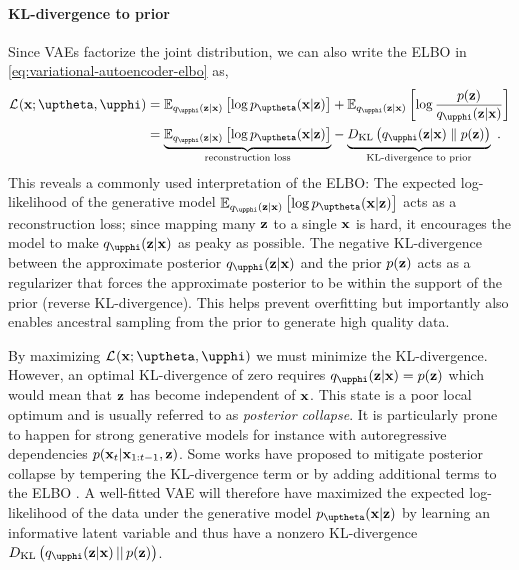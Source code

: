 \paragraph{KL-divergence to prior}
Since VAEs factorize the joint distribution, we can also write the ELBO in \cref{eq:variational-autoencoder-elbo} as,
%
\begin{align} \label{eq:variational-autoencoder-elbo-factorized}
    \mathcal{L}_{}(\xb;\thetab,\phib)
    &= \mathbb{E}_{q_\phib(\zb|\xb)}\left[\log p_\thetab(\xb|\zb)\right] + \mathbb{E}_{q_\phib(\zb|\xb)} \left[ \log \frac{p(\zb)}{q_\phib(\zb|\xb)}\right] \nonumber \\
    &= 
    \underset{\text{reconstruction loss}}{\underbrace{
        \mathbb{E}_{q_\phib(\zb|\xb)}\left[\log p_\thetab(\xb|\zb)\right]
    }}
     - 
    \underset{\text{KL-divergence to prior}}{
        \underbrace{\vphantom{\mathbb{E}_{q_\phib(\zb|\xb)}\left[\log p_\thetab(\xb|\zb)\right]}{D_\text{KL}\left( q_\phib(\zb|\xb) \parallel p(\zb) \right)}
    }} \enspace .
\end{align}
%
This reveals a commonly used interpretation of the ELBO: 
The expected log-likelihood of the generative model $\mathbb{E}_{q_\phib(\zb|\xb)}\left[\log p_\thetab(\xb|\zb)\right]$ acts as a reconstruction loss; since mapping many ${\mathbf{z}}$ to a single ${\mathbf{x}}$ is hard, it encourages the model to make $q_\phib(\zb|\xb)$ as peaky as possible. 
The negative KL-divergence between the approximate posterior $q_\phib(\zb|\xb)$ and the prior $p({\mathbf{z}})$ acts as a regularizer that forces the approximate posterior to be within the support of the prior (reverse KL-divergence). This helps prevent overfitting but importantly also enables ancestral sampling from the prior to generate high quality data. 

By maximizing $\mathcal{L}_{}(\xb;\thetab,\phib)$ we must minimize the KL-divergence. However, an optimal KL-divergence of zero requires $q_\phib(\zb|\xb) = p(\zb)$ which would mean that ${\mathbf{z}}$ has become independent of ${\mathbf{x}}$. 
This state is a poor local optimum and is usually referred to as \emph{posterior collapse}. It is particularly prone to happen for strong generative models for instance with autoregressive dependencies $p({\mathbf{x}}_{t}|{\mathbf{x}}_{1:t-1},{\mathbf{z}})$. Some works have proposed to mitigate posterior collapse by tempering the KL-divergence term \parencite{alemi_fixing_2018,higgins_vvae_2017} or by adding additional terms to the ELBO \parencite{zhao_infovae_2018}. 
A well-fitted VAE will therefore have maximized the expected log-likelihood of the data under the generative model $p_\thetab(\xb|\zb)$ by learning an informative latent variable and thus have a nonzero KL-divergence $D_\text{KL}\left( q_\phib(\zb|\xb) \,||\, p(\zb) \right)$. 


